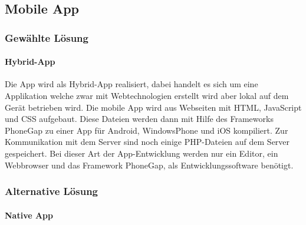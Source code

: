 \subsection{Mobile App}

\subsubsection{Gewählte Lösung}

\paragraph*{Hybrid-App\\}

Die App wird als Hybrid-App realisiert, dabei handelt es sich um eine Applikation welche zwar mit Webtechnologien erstellt wird aber lokal auf dem Gerät betrieben wird.
Die mobile App wird aus Webseiten mit HTML, JavaScript und CSS aufgebaut. Diese Dateien werden dann mit Hilfe des Frameworks PhoneGap zu einer App für Android, WindowsPhone und iOS kompiliert. Zur Kommunikation mit dem Server sind noch einige PHP-Dateien auf dem Server gespeichert.
Bei dieser Art der App-Entwicklung werden nur ein Editor, ein Webbrowser und das Framework PhoneGap, als Entwicklungssoftware benötigt.

\subsubsection{Alternative Lösung}
\paragraph*{Native App\\}

